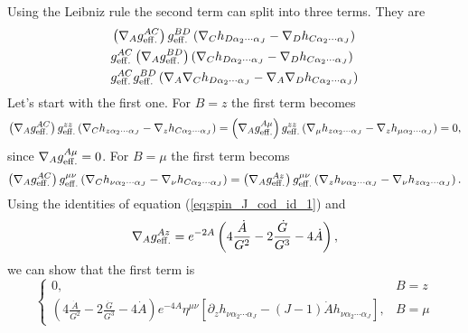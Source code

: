 \documentclass[10 pt]{article}
\begin{document}
Using the Leibniz rule the second term can split into three terms. They are
\begin{align}
&\left(\nabla_A g^{AC}_{\rm{eff.}}\right) g^{BD}_{\rm {eff.}} \left(\nabla_C h_{D \alpha_2 \cdots \alpha_J} - \nabla_D h_{C \alpha_2 \cdots \alpha_J}\right) \\
&g^{AC}_{\rm{eff.}}\left(\nabla_A g^{BD}_{\rm{eff.}}\right) \left(\nabla_C h_{D \alpha_2 \cdots \alpha_J} - \nabla_D h_{C \alpha_2 \cdots \alpha_J}\right) \\
& g^{AC}_{\rm{eff.}}g^{BD}_{\rm{eff.}} \left( \nabla_A \nabla_C h_{D \alpha_2 \cdots \alpha_J} - \nabla_A \nabla_D h_{C \alpha_2 \cdots \alpha_J}\right)
\end{align}
Let's start with the first one. For $B = z$ the first term becomes
\begin{equation}
\left(\nabla_A g^{AC}_{\rm{eff.}}\right) g^{zz}_{\rm {eff.}} \left(\nabla_C h_{z \alpha_2 \cdots \alpha_J} - \nabla_z h_{C \alpha_2 \cdots \alpha_J}\right) = \left(\nabla_A g^{A\mu}_{\rm{eff.}}\right) g^{zz}_{\rm {eff.}} \left(\nabla_\mu h_{z \alpha_2 \cdots \alpha_J} - \nabla_z h_{\mu \alpha_2 \cdots \alpha_J}\right) = 0,
\end{equation}
since $\nabla_A g^{A\mu}_{\rm{eff.}} = 0$.
For $B = \mu$ the first term becoms
\begin{equation}
\left(\nabla_A g^{AC}_{\rm{eff.}}\right) g^{\mu\nu}_{\rm {eff.}} \left(\nabla_C h_{\nu \alpha_2 \cdots \alpha_J} - \nabla_\nu h_{C \alpha_2 \cdots \alpha_J}\right) = \left(\nabla_A g^{Az}_{\rm{eff.}}\right) g^{\mu\nu}_{\rm {eff.}} \left(\nabla_z h_{\nu \alpha_2 \cdots \alpha_J} - \nabla_\nu h_{z \alpha_2 \cdots \alpha_J}\right).
\end{equation}
Using the identities of equation (\ref{eq:spin_J_cod_id_1}) and
\begin{align}
\nabla_A g^{Az}_{\rm{eff.}} = e^{-2A} \left( 4 \frac{\dot{A}}{G^2} - 2 \frac{\dot{G}}{G^3} - 4 \dot{A} \right),
\end{align}
we can show that the first term is
\begin{equation}
\begin{cases}
0, & B = z \\
\left( 4 \frac{\dot{A}}{G^2} - 2 \frac{\dot{G}}{G^3} - 4 \dot{A} \right) e^{-4A} \eta^{\mu \nu} \left[ \partial_z h_{\nu \alpha_2 \cdots \alpha_J} - \left(J-1\right) \dot{A} h_{\nu \alpha_2 \cdots \alpha_J} \right],  &B = \mu
\end{cases}
\end{equation}
\end{document}
